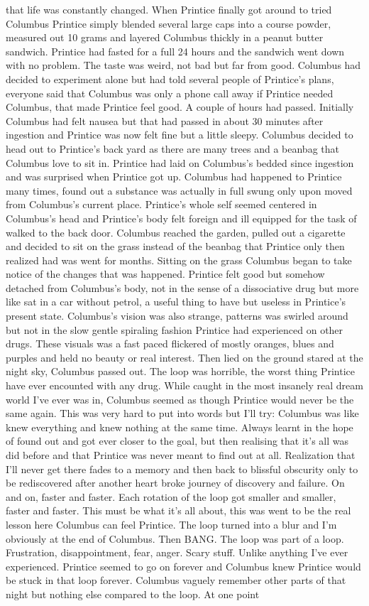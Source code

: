 \documentclass[12pt]{book}
\begin{document}
that life was constantly changed. When Printice finally got around to tried Columbus Printice simply blended several large caps into a course powder, measured out 10 grams and layered Columbus thickly in a peanut butter sandwich. Printice had fasted for a full 24 hours and the sandwich went down with no problem. The taste was weird, not bad but far from good. Columbus had decided to experiment alone but had told several people of Printice's plans, everyone said that Columbus was only a phone call away if Printice needed Columbus, that made Printice feel good. A couple of hours had passed. Initially Columbus had felt nausea but that had passed in about 30 minutes after ingestion and Printice was now felt fine but a little sleepy. Columbus decided to head out to Printice's back yard as there are many trees and a beanbag that Columbus love to sit in. Printice had laid on Columbus's bedded since ingestion and was surprised when Printice got up. Columbus had happened to Printice many times, found out a substance was actually in full swung only upon moved from Columbus's current place. Printice's whole self seemed centered in Columbus's head and Printice's body felt foreign and ill equipped for the task of walked to the back door. Columbus reached the garden, pulled out a cigarette and decided to sit on the grass instead of the beanbag that Printice only then realized had was went for months. Sitting on the grass Columbus began to take notice of the changes that was happened. Printice felt good but somehow detached from Columbus's body, not in the sense of a dissociative drug but more like sat in a car without petrol, a useful thing to have but useless in Printice's present state. Columbus's vision was also strange, patterns was swirled around but not in the slow gentle spiraling fashion Printice had experienced on other drugs. These visuals was a fast paced flickered of mostly oranges, blues and purples and held no beauty or real interest. Then lied on the ground stared at the night sky, Columbus passed out. The loop was horrible, the worst thing Printice have ever encounted with any drug. While caught in the most insanely real dream world I've ever was in, Columbus seemed as though Printice would never be the same again. This was very hard to put into words but I'll try: Columbus was like knew everything and knew nothing at the same time. Always learnt in the hope of found out and got ever closer to the goal, but then realising that it's all was did before and that Printice was never meant to find out at all. Realization that I'll never get there fades to a memory and then back to blissful obscurity only to be rediscovered after another heart broke journey of discovery and failure. On and on, faster and faster. Each rotation of the loop got smaller and smaller, faster and faster. This must be what it's all about, this was went to be the real lesson here Columbus can feel Printice. The loop turned into a blur and I'm obviously at the end of Columbus. Then BANG. The loop was part of a loop. Frustration, disappointment, fear, anger. Scary stuff. Unlike anything I've ever experienced. Printice seemed to go on forever and Columbus knew Printice would be stuck in that loop forever. Columbus vaguely remember other parts of that night but nothing else compared to the loop. At one point 
\end{document}
